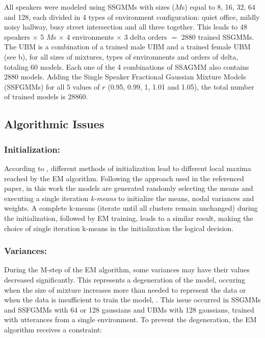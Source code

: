 All speakers were modeled using SSGMMs with sizes ($M$s) equal to 8, 16, 32, 64 and 128, each divided in 4 types of environment configuration: quiet office, mildly noisy hallway, busy street intersection and all three together. This leads to 48 speakers $\times$ 5 $M$s $\times$ 4 environments $\times$ 3 delta orders $=$ 2880 trained SSGMMs. The UBM is a combination of a trained male UBM and a trained female UBM (see b), for all sizes of mixtures, types of environments and orders of delta, totaling 60 models. Each one of the 4 combinations of SSAGMM also contains 2880 models. Adding the Single Speaker Fractional Gaussian Mixture Models (SSFGMMs) for all 5 values of $r$ (0.95, 0.99, 1, 1.01 and 1.05), the total number of trained models is 28860.

\subsection{Algorithmic Issues}

\subsubsection{Initialization:}

According to , different methods of initialization lead to different local maxima reached by the EM algorithm. Following the approach used in the referenced paper, in this work the models are generated randomly selecting the means and executing a single iteration \emph{k-means} to initialize the means, nodal variances and weights. A complete k-means (iterate until all clusters remain unchanged) during the initialization, followed by EM training, leads to a similar result, making the choice of single iteration k-means in the initialization the logical decision.

\subsubsection{Variances:}

During the M-step of the EM algorithm, some variances may have their values decreased significantly. This represents a degeneration of the model, occuring when the size of mixture increases more than needed to represent the data or when the data is insufficient to train the model, . This issue occurred in SSGMMs and SSFGMMs with 64 or 128 gaussians and UBMs with 128 gaussians, trained with utterances from a single environment. To prevent the degeneration, the EM algorithm receives a constraint:

